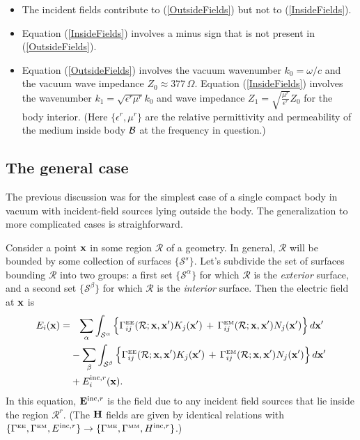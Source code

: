 \begin{itemize}
 \item The incident fields contribute to (\ref{OutsideFields})
       but not to (\ref{InsideFields}).
 \item Equation (\ref{InsideFields}) involves a minus sign that 
       is not present in (\ref{OutsideFields}).
 \item Equation (\ref{OutsideFields}) involves the vacuum
       wavenumber $k_0=\omega/c$ and the vacuum 
       wave impedance $Z_0\approx 377 \, \Omega.$
       Equation (\ref{InsideFields}) involves the wavenumber 
       $k_1=\sqrt{\epsilon^r \mu^r}k_0$ and wave impedance 
       $Z_1=\sqrt{\frac{\mu^r}{\epsilon^r}}Z_0$ for the body interior.
       (Here $\{\epsilon^r, \mu^r\}$ are the relative permittivity 
        and permeability of the medium inside body $\mathcal{B}$ at the 
        frequency in question.)
\end{itemize}

\subsection{The general case}

The previous discussion was for the simplest case of a 
single compact body in vacuum with incident-field 
sources lying outside the body. The generalization
to more complicated cases is straighforward. 

Consider a point $\mathbf{x}$ in some region $\mathcal{R}$
of a \lss geometry. In general, $\mathcal{R}$
will be bounded by some collection of surfaces
$\{\mathcal{S}^s\}$. Let's subdivide the set of 
surfaces bounding $\mathcal{R}$ into two groups:
a first set $\{\mathcal{S}^\alpha\}$ for which
$\mathcal{R}$ is the \textit{exterior} surface,
and a second set $\{\mathcal{S}^\beta\}$ for which
$\mathcal{R}$ is the \textit{interior} surface.
Then the electric field at $\mathbf{x}$ is
\begin{align} 
E_i(\mathbf{x}) 
    = &\hphantom{-} \sum_\alpha \int_{\mathcal{S}^\alpha} 
           \Big\{ \Gamma_{ij}^{\hbox{\tiny{EE}}}(\mathcal{R}; \mathbf{x}, \mathbf{x}^\prime) 
                   K_j(\mathbf{x}^\prime)
                  \,+\,
                   \Gamma_{ij}^{\hbox{\tiny{EM}}}(\mathcal{R}; \mathbf{x}, \mathbf{x}^\prime) 
                   N_j(\mathbf{x}^\prime)
           \Big\} \, d\mathbf{x}^\prime
\nonumber \\
     &-\sum_\beta \int_{\mathcal{S}^\beta} 
           \Big\{ \Gamma_{ij}^{\hbox{\tiny{EE}}}(\mathcal{R}; \mathbf{x}, \mathbf{x}^\prime) 
                   K_j(\mathbf{x}^\prime)
                  \,+\,
                   \Gamma_{ij}^{\hbox{\tiny{EM}}}(\mathcal{R}; \mathbf{x}, \mathbf{x}^\prime) 
                   N_j(\mathbf{x}^\prime)
           \Big\} \, d\mathbf{x}^\prime
\nonumber \\
     &+E^{\text{\scriptsize inc},r}_i(\mathbf{x}).
\label{FieldContributionsEquation}
\end{align}
In this equation, $\mathbf{E}^{\text{\scriptsize inc},r}$ is the field due to any 
incident field sources that lie inside the region $\mathcal{R}^r.$
(The $\mathbf{H}$ fields are given by identical relations with 
$\{ \Gamma^{\hbox{\tiny{EE}}}, \Gamma^{\hbox{\tiny{EM}}}, E^{\text{\scriptsize inc},r}\} \to 
 \{ \Gamma^{\hbox{\tiny{ME}}}, \Gamma^{\hbox{\tiny{MM}}}, H^{\text{\scriptsize inc},r}\}$.)

